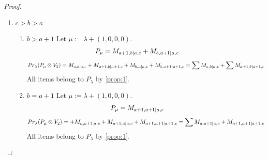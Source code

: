 \documentclass[12pt,a4paper]{article}
\begin{document}
\begin{proof}
\begin{enumerate}
\begin{enumerate}
\item $c=a+1,b=c+1$
   Let $\mu:=\lambda + (0,0,1,1) $. 
\begin{equation}\notag
  \begin{aligned}
      P_{\mu} =M_{a+2,a+2|a,a+1}
  \end{aligned}
\end{equation}
\begin{equation}\notag
  \begin{aligned}
  Pr_{\lambda}(P_\mu \otimes V_1) &=
M_{a+2,a+2|a+1,a+2}
+M_{a+1,a+2|a+1,a+1}\\
                                  &+
M_{a+2,a+1|a+1,a+1}
+M_{a,a+2|a,a+1}
+M_{a+2,a|a,a+1} \\
                                  &=
\sum M_{a,a+2|a,a+1}
+\sum M_{a+1,a+2|a+1,a+1}
+ M_{a+2,a+2|a+1,a+2}
  \end{aligned}
\end{equation}
All items belong to $P_\lambda$ by \cref{prop:1}.

  \end{enumerate}
  
\item $c>b>a$
  \begin{enumerate}
    \item $b>a+1$
        Let $\mu:=\lambda + (1,0,0,0) $. 
\begin{equation}\notag
  \begin{aligned}
      P_{\mu} =M_{a+1,b|a,c}
+M_{b,a+1|a,c}
  \end{aligned}
\end{equation}
\begin{equation}\notag
  \begin{aligned}
  Pr_{\lambda}(P_\mu \otimes V_2) &=
M_{a,b|a,c}
+M_{a+1,b|a+1,c}
+M_{b,a|a,c}
+M_{b,a+1|a+1,c}
                                  =
\sum M_{a,b|a,c}
+\sum M_{a+1,b|a+1,c}
  \end{aligned}
\end{equation}
All items belong to $P_\lambda$ by \cref{prop:1}.
    
\item $b=a+1$
        Let $\mu:=\lambda + (1,0,0,0) $. 
\begin{equation}\notag
  \begin{aligned}
      P_{\mu} =M_{a+1,a+1|a,c}
  \end{aligned}
\end{equation}
\begin{equation}\notag
  \begin{aligned}
  Pr_{\lambda}(P_\mu \otimes V_2) &=
+M_{a,a+1|a,c}
+M_{a+1,a|a,c}
+M_{a+1,a+1|a+1,c}
                                  =
\sum M_{a,a+1|a,c}
+ M_{a+1,a+1|a+1,c}
  \end{aligned}
\end{equation}
All items belong to $P_\lambda$ by \cref{prop:1}.
  \end{enumerate}

\end{enumerate}
\end{proof}
\end{document}
